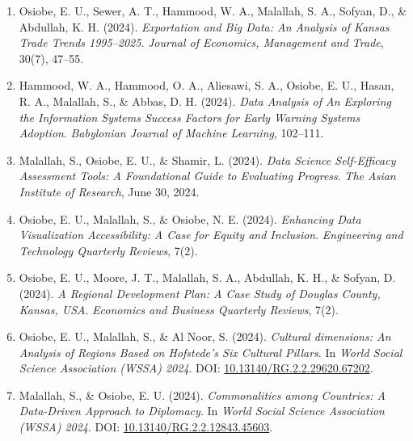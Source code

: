 \documentclass[11pt]{article}
\begin{document}
\begin{enumerate}
\item Osiobe, E. U., Sewer, A. T., Hammood, W. A., Malallah, S. A., Sofyan, D., \& Abdullah, K. H. (2024). \textit{Exportation and Big Data: An Analysis of Kansas Trade Trends 1995–2025}. \textit{Journal of Economics, Management and Trade}, 30(7), 47–55.

\item Hammood, W. A., Hammood, O. A., Aliesawi, S. A., Osiobe, E. U., Hasan, R. A., Malallah, S., \& Abbas, D. H. (2024). \textit{Data Analysis of An Exploring the Information Systems Success Factors for Early Warning Systems Adoption}. \textit{Babylonian Journal of Machine Learning}, 102–111.

\item Malallah, S., Osiobe, E. U., \& Shamir, L. (2024). \textit{Data Science Self-Efficacy Assessment Tools: A Foundational Guide to Evaluating Progress}. \textit{The Asian Institute of Research}, June 30, 2024.

\item Osiobe, E. U., Malallah, S., \& Osiobe, N. E. (2024). \textit{Enhancing Data Visualization Accessibility: A Case for Equity and Inclusion}. \textit{Engineering and Technology Quarterly Reviews}, 7(2).

\item Osiobe, E. U., Moore, J. T., Malallah, S. A., Abdullah, K. H., \& Sofyan, D. (2024). \textit{A Regional Development Plan: A Case Study of Douglas County, Kansas, USA}. \textit{Economics and Business Quarterly Reviews}, 7(2).

\item Osiobe, E. U., Malallah, S., \& Al Noor, S. (2024). \textit{Cultural dimensions: An Analysis of Regions Based on Hofstede’s Six Cultural Pillars}. In \textit{World Social Science Association (WSSA) 2024}. DOI: \href{https://doi.org/10.13140/RG.2.2.29620.67202}{10.13140/RG.2.2.29620.67202}.

\item Malallah, S., \& Osiobe, E. U. (2024). \textit{Commonalities among Countries: A Data-Driven Approach to Diplomacy}. In \textit{World Social Science Association (WSSA) 2024}. DOI: \href{https://doi.org/10.13140/RG.2.2.12843.45603}{10.13140/RG.2.2.12843.45603}.

\end{enumerate}
\end{document}
